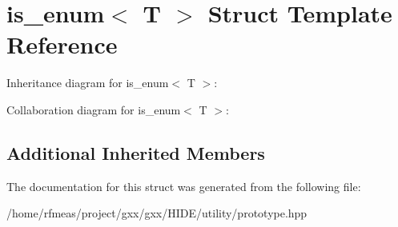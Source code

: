 \hypertarget{structis__enum}{}\section{is\+\_\+enum$<$ T $>$ Struct Template Reference}
\label{structis__enum}


Inheritance diagram for is\+\_\+enum$<$ T $>$\+:


Collaboration diagram for is\+\_\+enum$<$ T $>$\+:
\subsection*{Additional Inherited Members}


The documentation for this struct was generated from the following file\+:\begin{DoxyCompactItemize}
\item 
/home/rfmeas/project/gxx/gxx/\+H\+I\+D\+E/utility/prototype.\+hpp\end{DoxyCompactItemize}
